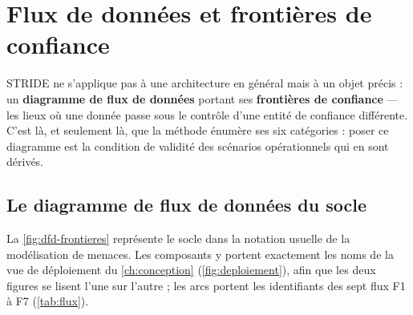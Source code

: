 \section{Flux de données et frontières de confiance}
\label{sec:dfd-frontieres}

STRIDE ne s'applique pas à une architecture en général mais à un objet précis : un
\textbf{diagramme de flux de données} portant ses \textbf{frontières de confiance} --- les lieux
où une donnée passe sous le contrôle d'une entité de confiance différente. C'est là, et seulement
là, que la méthode énumère ses six catégories : poser ce diagramme est la condition de validité des
scénarios opérationnels qui en sont dérivés.

\subsection{Le diagramme de flux de données du socle}

La \cref{fig:dfd-frontieres} représente le socle dans la notation usuelle de la modélisation de
menaces. Les composants y portent exactement les noms de la vue de déploiement du \cref{ch:conception}
(\cref{fig:deploiement}), afin que les deux figures se lisent l'une sur l'autre ; les arcs portent
les identifiants des sept flux F1 à F7 (\cref{tab:flux}).

